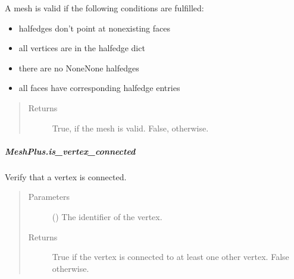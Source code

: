 \documentclass[letterpaper,10pt,english]{sphinxmanual}
\begin{document}
\begin{fulllineitems}
\begin{fulllineitems}
A mesh is valid if the following conditions are fulfilled:
\begin{itemize}
\item {} 
halfedges don’t point at non\sphinxhyphen{}existing faces

\item {} 
all vertices are in the halfedge dict

\item {} 
there are no None\sphinxhyphen{}None halfedges

\item {} 
all faces have corresponding halfedge entries

\end{itemize}
\begin{quote}\begin{description}
\item[{Returns}] \leavevmode
{} \textendash{} True, if the mesh is valid.
False, otherwise.

\end{description}\end{quote}

\end{fulllineitems}



\subparagraph{MeshPlus.is\_vertex\_connected}
\label{\detokenize{api/generated/directional_clustering.mesh.MeshPlus.is_vertex_connected:meshplus-is-vertex-connected}}\label{\detokenize{api/generated/directional_clustering.mesh.MeshPlus.is_vertex_connected::doc}}

\begin{fulllineitems}
\label{\detokenize{api/generated/directional_clustering.mesh.MeshPlus.is_vertex_connected:directional_clustering.mesh.MeshPlus.is_vertex_connected}}
Verify that a vertex is connected.
\begin{quote}\begin{description}
\item[{Parameters}] \leavevmode
{} () \textendash{} The identifier of the vertex.

\item[{Returns}] \leavevmode
{} \textendash{} True if the vertex is connected to at least one other vertex.
False otherwise.


\end{description}
\end{quote}
\end{fulllineitems}
\end{fulllineitems}
\end{document}
